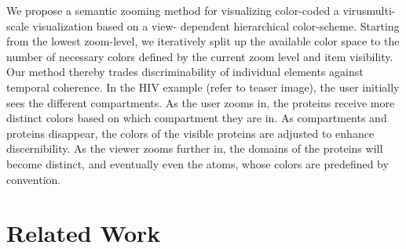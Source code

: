 \documentclass[review,journal]{vgtc}         %
\begin{document}
We propose a semantic zooming method for visualizing color-coded a virusmulti-scale visualization based on a view- dependent hierarchical color-scheme. Starting from the lowest zoom-level, we iteratively split up the available color space to the number of necessary colors defined by the current zoom level and item visibility. Our method thereby trades discriminability of individual elements against temporal coherence. In the HIV example (refer to teaser image), the user initially sees the different compartments. As the user zooms in, the proteins receive more distinct colors based on which compartment they are in. As compartments and proteins disappear, the colors of the visible proteins are adjusted to enhance discernibility.  As the viewer zooms further in, the domains of the proteins will become distinct, and eventually even the atoms, whose colors are predefined by convention. 

\section{Related Work}
\end{document}
